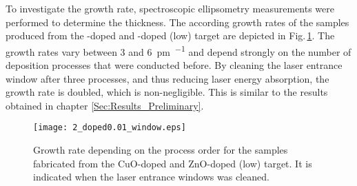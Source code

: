 To investigate the growth rate, spectroscopic ellipsometry measurements were performed to determine the thickness.
The according growth rates of the samples produced from the -doped and -doped (low) target are depicted in Fig.\,\ref{Fig:Results_2_windowCleaning}.
The growth rates vary between 3 and \qty{6}{\pm\per\pulse} and depend strongly on the number of deposition processes that were conducted before.
By cleaning the laser entrance window after three processes, and thus reducing laser energy absorption, the growth rate is doubled, which is non-negligible.
This is similar to the results obtained in chapter \ref{Sec:Results_Preliminary}.
\begin{figure}
    \centering
    \texttt{[image: 2\_doped0.01\_window.eps]}
    \caption{
        Growth rate depending on the process order for the samples fabricated from the CuO-doped and ZnO-doped (low) target.
        It is indicated when the laser entrance windows was cleaned.
    }
    \label{Fig:Results_2_windowCleaning}
\end{figure}

